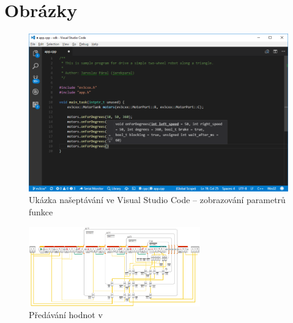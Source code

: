 \chapter{Obrázky}


\begin{figure}[h]
    \centering
    \includegraphics[width=\textwidth]{images/visual-studio-code_intellisense-param.png}
    \caption{Ukázka našeptávání ve Visual Studio Code -- zobrazování parametrů funkce}
    \label{fig:visual-studio-code_intellisense-param}
\end{figure}


\begin{figure}[h]
	\centering
	\includegraphics[angle=-90,origin=c,width=280px]{images/lego-soft_legolib_match_array_length.png}
	\caption[Předávání hodnot v \legoSW{}]{Předávání hodnot v \legoSW{}}
	\label{fig:lego-soft_legolib_match_array_length}
\end{figure}




